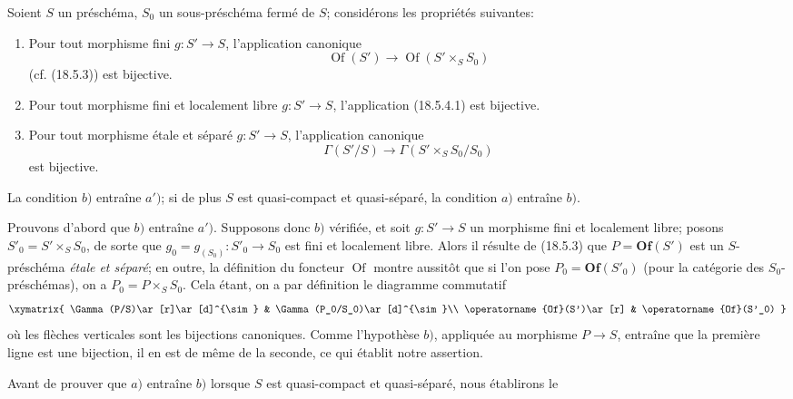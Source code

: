 \begin{proposition}[18.5.4]
\label{IV.18.5.4}
Soient $S$ un préschéma, $S_0$ un sous-préschéma fermé de $S$; considérons les propriétés suivantes:
\begin{enumerate}
  \item[a)] Pour tout morphisme fini $g:S'\to S$, l'application canonique
  \begin{equation}
    \operatorname{Of}(S')\longrightarrow\operatorname{Of}(S'\times_S S_0)
    \tag{18.5.4.1}\label{IV.18.5.4.1}
  \end{equation}
  (cf. (18.5.3)) est bijective.
  \item[a')] Pour tout morphisme fini et localement libre $g:S'\to S$, l'application (18.5.4.1) est bijective.


  \item[b)] Pour tout morphisme étale et séparé $g:S'\to S$, l'application canonique
  \begin{equation}
    \Gamma(S'/S)\longrightarrow\Gamma(S'\times_S S_0/S_0)
    \tag{18.5.4.2}\label{IV.18.5.4.2}
  \end{equation}
  est bijective.
\end{enumerate}
La condition $b)$ entraîne $a')$; si de plus $S$ est quasi-compact et quasi-séparé, la condition $a)$ entraîne $b)$.
\end{proposition}

Prouvons d'abord que $b)$ entraîne $a')$. Supposons donc $b)$ vérifiée, et soit $g:S'\to S$ un morphisme fini et localement libre; posons $S'_0=S'\times_S S_0$, de sorte que $g_0=g_{(S_0)}:S'_0\to S_0$ est fini et localement libre. Alors il résulte de (18.5.3) que $P=\mathbf{Of}(S')$ est un $S$-préschéma \emph{étale et séparé}; en outre, la définition du foncteur $\operatorname{Of}$ montre aussitôt que si l'on pose $P_0=\mathbf{Of}(S'_0)$ (pour la catégorie des $S_0$-préschémas), on a $P_0=P\times_S S_0$. Cela étant, on a par définition le diagramme commutatif
\[
\xymatrix{
  \Gamma(P/S)\ar[r]\ar[d]^{\sim} & \Gamma(P_0/S_0)\ar[d]^{\sim}\\
  \operatorname{Of}(S')\ar[r] & \operatorname{Of}(S'_0)
}
\]
où les flèches verticales sont les bijections canoniques. Comme l'hypothèse $b)$, appliquée au morphisme $P\to S$, entraîne que la première ligne est une bijection, il en est de même de la seconde, ce qui établit notre assertion.

Avant de prouver que $a)$ entraîne $b)$ lorsque $S$ est quasi-compact et quasi-séparé, nous établirons le

